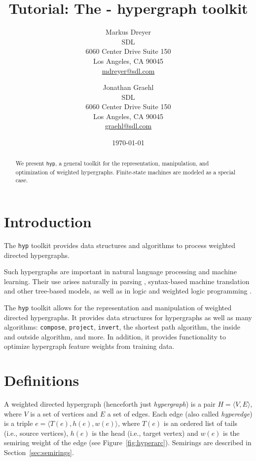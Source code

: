 \documentclass[12pt]{article}
\title{Tutorial: The \hyp{} hypergraph toolkit}
\author{
  Markus Dreyer\\
  SDL\\
  6060 Center Drive Suite 150\\
  Los Angeles, CA 90045\\
  \url{mdreyer@sdl.com}
  \and
  Jonathan Graehl\\
  SDL\\
  6060 Center Drive Suite 150\\
  Los Angeles, CA 90045\\
  \url{graehl@sdl.com}
}
\date{\today}
\newcommand{\hyp}{\texttt{hyp}\xspace}
\newcommand{\code}[1]{\texttt{#1}}
\newcommand{\secref}[1]{Section~\ref{sec:#1}}
\newcommand{\figref}[1]{Figure~\ref{fig:#1}}
\let\cite\citep    %
\begin{document}
\maketitle

\begin{abstract}
  We present \hyp, a general toolkit for the representation,
  manipulation, and optimization of weighted hypergraphs. Finite-state
  machines are modeled as a special case.
\end{abstract}

\tableofcontents

\section{Introduction}

The \hyp{} toolkit provides data structures and algorithms to process
weighted directed hypergraphs.

Such hypergraphs are important in natural language processing and
machine learning. Their use arises naturally in parsing
\cite{klein_parsing_2005, huang_better_2005}, syntax-based machine
translation and other tree-based models, as well as in logic
\cite{gallo_directed_1993} and weighted logic programming
\cite{eisner_dyna:_2011}.

The \hyp{} toolkit allows for the representation and manipulation of
weighted directed hypergraphs. It provides data structures for
hypergraphs as well as many algorithms: \code{compose}, 
\code{project}, \code{invert}, the shortest path algorithm, the inside
and outside algorithm, and more. In addition, it provides
functionality to optimize hypergraph feature weights from training
data.

\section{Definitions}\label{sec:definitions}
A weighted directed hypergraph (henceforth just \textit{hypergraph})
is a pair $H=\langle V,E\rangle$, where $V$ is a set of vertices and
$E$ a set of edges. Each edge (also called \textit{hyperedge}) is a
triple $e=\langle T(e), h(e), w(e) \rangle$, where $T(e)$ is an
ordered list of tails (i.e., source vertices), $h(e)$ is the head
(i.e., target vertex) and $w(e)$ is the semiring weight of the edge
(see \figref{hyperarc}). Semirings are described in
\secref{semirings}.
\end{document}
